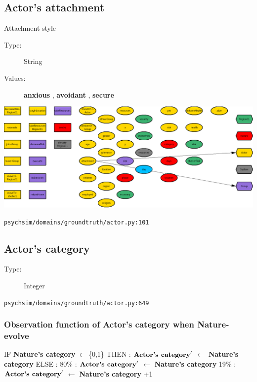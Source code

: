 \documentclass{article}%
\begin{document}
%
\subsection{Actor's attachment}%
\label{subsec:Actor's attachment}%
Attachment style%
\begin{description}%
\item[Type:]%
String%
\item[Values:]%
\textbf{anxious}%
, %
\textbf{avoidant}%
, %
\textbf{secure}%
\end{description}%
\includegraphics[width=\textwidth]{images/attachmentOfActor.png}%
\begin{flushleft}%
\verb|psychsim/domains/groundtruth/actor.py:101|%
\end{flushleft}

%
\subsection{Actor's category}%
\label{subsec:Actor's category}%
\begin{description}%
\item[Type:]%
Integer%
\end{description}%
\begin{flushleft}%
\verb|psychsim/domains/groundtruth/actor.py:649|%
\end{flushleft}%
\subsubsection{Observation function of Actor's category when Nature{-}evolve}%
\label{ssubsec:Observation function of Actor's category when Nature{-}evolve}%
\begin{flushleft}%
IF %
\textbf{Nature's category}%
$\in$%
\{0,1\}%
\linebreak%
\hspace*{2em}%
THEN %
: %
$\mbox{\textbf{Actor's category}} '$%
$\leftarrow$%
\textbf{Nature's category}%
\linebreak%
\hspace*{2em}%
ELSE %
: %
\linebreak%
\hspace*{4em}%
80\%%
: %
$\mbox{\textbf{Actor's category}} '$%
$\leftarrow$%
\textbf{Nature's category}%
\linebreak%
\hspace*{4em}%
19\%%
: %
$\mbox{\textbf{Actor's category}} '$%
$\leftarrow$%
\textbf{Nature's category}%
+1%
\end{flushleft}
\end{document}
